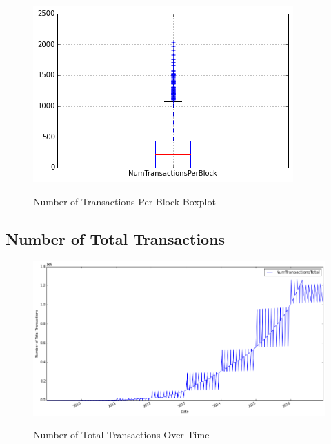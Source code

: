\begin{figure}[bth]
  \myfloatalign
  {\includegraphics[width=1\linewidth]
    {gfx/n-transactions-per-block-boxplot}}
  \caption{Number of Transactions Per Block
    Boxplot}
  \label{fig:n-transactions-per-block-boxplot}
\end{figure}

\clearpage

\subsection{Number of Total Transactions}
\label{sec:n-transactions-total}

\begin{figure}[bth]
  \myfloatalign
  {\includegraphics[width=1\linewidth]
    {gfx/n-transactions-total-over-time}}
  \caption{Number of Total Transactions
    Over Time}
  \label{fig:n-transactions-total-over-time}
\end{figure}

